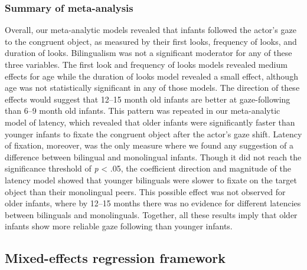 \documentclass[
  english,
  ,man,floatsintext]{apa6}
\begin{document}
\hypertarget{summary-of-meta-analysis}{%
\subsubsection{Summary of meta-analysis}\label{summary-of-meta-analysis}}

Overall, our meta-analytic models revealed that infants followed the actor's gaze to the congruent object, as measured by their first looks, frequency of looks, and duration of looks. Bilingualism was not a significant moderator for any of these three variables. The first look and frequency of looks models revealed medium effects for age while the duration of looks model revealed a small effect, although age was not statistically significant in any of those models. The direction of these effects would suggest that 12--15 month old infants are better at gaze-following than 6--9 month old infants. This pattern was repeated in our meta-analytic model of latency, which revealed that older infants were significantly faster than younger infants to fixate the congruent object after the actor's gaze shift. Latency of fixation, moreover, was the only measure where we found any suggestion of a difference between bilingual and monolingual infants. Though it did not reach the significance threshold of \emph{p} \textless{} .05, the coefficient direction and magnitude of the latency model showed that younger bilinguals were slower to fixate on the target object than their monolingual peers. This possible effect was not observed for older infants, where by 12--15 months there was no evidence for different latencies between bilinguals and monolinguals. Together, all these results imply that older infants show more reliable gaze following than younger infants.

\hypertarget{mixed-effects-regression-framework}{%
\subsection{Mixed-effects regression framework}\label{mixed-effects-regression-framework}}
\end{document}
